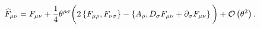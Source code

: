 \begin{equation}
\widehat{F}_{\mu\nu} =F_{\mu\nu}+\frac{1}{4}\theta ^{\rho\sigma}\bigg( 2\left\{
F_{\mu\rho},F_{\nu\sigma}\right\} -\left\{ A_{\rho},D_{\sigma}F_{\mu\nu}+\partial _{\sigma}F_{\mu\nu}\right\}
\bigg) +{\cal O}\left( \theta ^{2}\right). 
\label{swf}
\end{equation}

